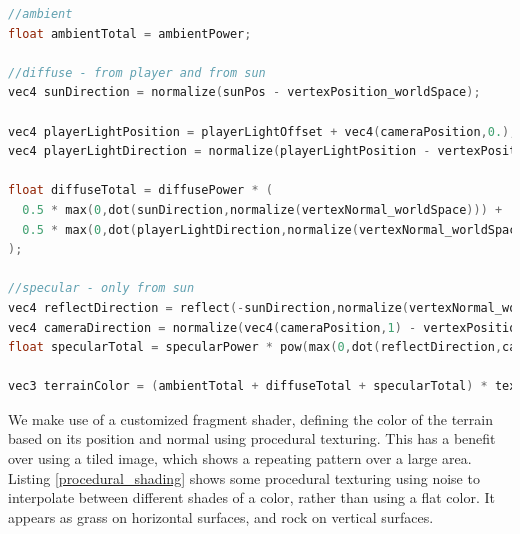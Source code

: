 \documentclass[11pt]{article}
\begin{document}
\begin{lstlisting}[language=C++,label={lighting},caption={Part of the fragment shader implementing this lighting model.}]
//ambient
float ambientTotal = ambientPower;

//diffuse - from player and from sun
vec4 sunDirection = normalize(sunPos - vertexPosition_worldSpace);

vec4 playerLightPosition = playerLightOffset + vec4(cameraPosition,0.);
vec4 playerLightDirection = normalize(playerLightPosition - vertexPosition_worldSpace);

float diffuseTotal = diffusePower * (
  0.5 * max(0,dot(sunDirection,normalize(vertexNormal_worldSpace))) +
  0.5 * max(0,dot(playerLightDirection,normalize(vertexNormal_worldSpace)))
);

//specular - only from sun
vec4 reflectDirection = reflect(-sunDirection,normalize(vertexNormal_worldSpace));
vec4 cameraDirection = normalize(vec4(cameraPosition,1) - vertexPosition_worldSpace);
float specularTotal = specularPower * pow(max(0,dot(reflectDirection,cameraDirection)),specularExponent);

vec3 terrainColor = (ambientTotal + diffuseTotal + specularTotal) * textureColor;
\end{lstlisting}
We make use of a customized fragment shader, defining the color of the terrain based on its position and normal using procedural texturing. This has a benefit over using a tiled image, which shows a repeating pattern over a large area. Listing \ref{procedural_shading} shows some procedural texturing using noise to interpolate between different shades of a color, rather than using a flat color. It appears as grass on horizontal surfaces, and rock on vertical surfaces.
\end{document}
